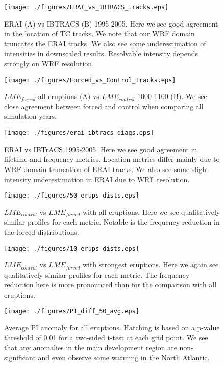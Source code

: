 \documentclass[smallextended]{svjour3}       %
\begin{document}
\begin{figure}[!tbp]
\centering
\texttt{[image: ./figures/ERAI\_vs\_IBTRACS\_tracks.eps]}
\caption{ERAI (A) vs IBTRACS (B) 1995-2005. Here we see good agreement in the location of TC tracks. We note that our WRF domain truncates the ERAI tracks. We also see some underestimation of intensities in downscaled results. Resolvable intensity depends strongly on WRF resolution.}
\label{erai_ibtracs_tracks}
\end{figure}

\begin{figure}[!tbp]
\centering
\texttt{[image: ./figures/Forced\_vs\_Control\_tracks.eps]}
\caption{$LME_{forced}$ all eruptions (A) vs $LME_{control}$ 1000-1100 (B). We see close agreement between forced and control when comparing all simulation years.}
\label{forced_ctrl_tracks}
\end{figure}

\begin{figure}[!tbp]
\centering
\texttt{[image: ./figures/erai\_ibtracs\_diags.eps]}
\caption{ERAI vs IBTrACS 1995-2005. Here we see good agreement in lifetime and frequency metrics. Location metrics differ mainly due to WRF domain truncation of ERAI tracks. We also see some slight intensity underestimation in ERAI due to WRF resolution.}
\label{evi_diags}
\end{figure}

\begin{figure}[!tbp]
\centering
\texttt{[image: ./figures/50\_erups\_dists.eps]}
\caption{$LME_{control}$ vs $LME_{forced}$ with all eruptions. Here we see qualitatively similar profiles for each metric. Notable is the frequency reduction in the forced distributions. }
\label{50_erups}
\end{figure}

\begin{figure}[!tbp]
\centering
\texttt{[image: ./figures/10\_erups\_dists.eps]}
\caption{$LME_{control}$ vs $LME_{forced}$ with strongest eruptions. Here we again see qualitatively similar profiles for each metric. The frequency reduction here is more pronounced than for the comparison with all eruptions. }
\label{10_erups}
\end{figure}

\begin{figure}[!tbp]
\centering
\texttt{[image: ./figures/PI\_diff\_50\_avg.eps]}
\caption{Average PI anomaly for all eruptions. Hatching is based on a p-value threshold of 0.01 for a two-sided t-test at each grid point. We see that any anomalies in the main development region are non-significant and even observe some warming in the North Atlantic.}
\label{pi_all_avg}
\end{figure}
\end{document}
